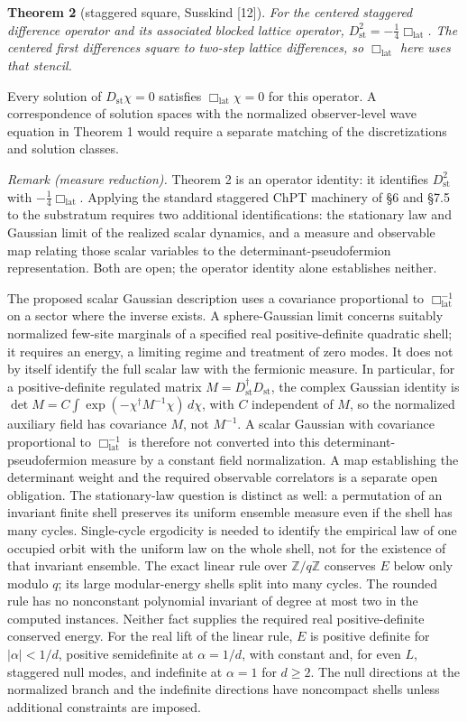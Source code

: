 \documentclass[
]{article}
\begin{document}
\textbf{Theorem 2} (staggered square, Susskind {[}12{]}). \emph{For the
centered staggered difference operator and its associated blocked
lattice operator, \(D_{\text{st}}^2 = -\frac{1}{4}\Box_{\text{lat}}\).
The centered first differences square to two-step lattice differences,
so \(\Box_{\text{lat}}\) here uses that stencil.}

Every solution of \(D_{\text{st}}\chi=0\) satisfies
\(\Box_{\text{lat}}\chi=0\) for this operator. A correspondence of
solution spaces with the normalized observer-level wave equation in
Theorem 1 would require a separate matching of the discretizations and
solution classes.

\emph{Remark (measure reduction).} Theorem 2 is an operator identity: it
identifies \(D_{\mathrm{st}}^2\) with \(-\tfrac14\Box_{\mathrm{lat}}\).
Applying the standard staggered ChPT machinery of §6 and §7.5 to the
substratum requires two additional identifications: the stationary law
and Gaussian limit of the realized scalar dynamics, and a measure and
observable map relating those scalar variables to the
determinant-pseudofermion representation. Both are open; the operator
identity alone establishes neither.

The proposed scalar Gaussian description uses a covariance proportional
to \(\Box_{\mathrm{lat}}^{-1}\) on a sector where the inverse exists. A
sphere-Gaussian limit concerns suitably normalized few-site marginals of
a specified real positive-definite quadratic shell; it requires an
energy, a limiting regime and treatment of zero modes. It does not by
itself identify the full scalar law with the fermionic measure. In
particular, for a positive-definite regulated matrix
\(M=D_{\mathrm{st}}^\dagger D_{\mathrm{st}}\), the complex Gaussian
identity is \(\det M=C\int \exp(-\chi^\dagger M^{-1}\chi)\,d\chi\), with
\(C\) independent of \(M\), so the normalized auxiliary field has
covariance \(M\), not \(M^{-1}\). A scalar Gaussian with covariance
proportional to \(\Box_{\mathrm{lat}}^{-1}\) is therefore not converted
into this determinant-pseudofermion measure by a constant field
normalization. A map establishing the determinant weight and the
required observable correlators is a separate open obligation. The
stationary-law question is distinct as well: a permutation of an
invariant finite shell preserves its uniform ensemble measure even if
the shell has many cycles. Single-cycle ergodicity is needed to identify
the empirical law of one occupied orbit with the uniform law on the
whole shell, not for the existence of that invariant ensemble. The exact
linear rule over \(\mathbb Z/q\mathbb Z\) conserves \(E\) below only
modulo \(q\); its large modular-energy shells split into many cycles.
The rounded rule has no nonconstant polynomial invariant of degree at
most two in the computed instances. Neither fact supplies the required
real positive-definite conserved energy. For the real lift of the linear
rule, \(E\) is positive definite for \(|\alpha|<1/d\), positive
semidefinite at \(\alpha=1/d\), with constant and, for even \(L\),
staggered null modes, and indefinite at \(\alpha=1\) for \(d\ge2\). The
null directions at the normalized branch and the indefinite directions
have noncompact shells unless additional constraints are imposed.
\end{document}
